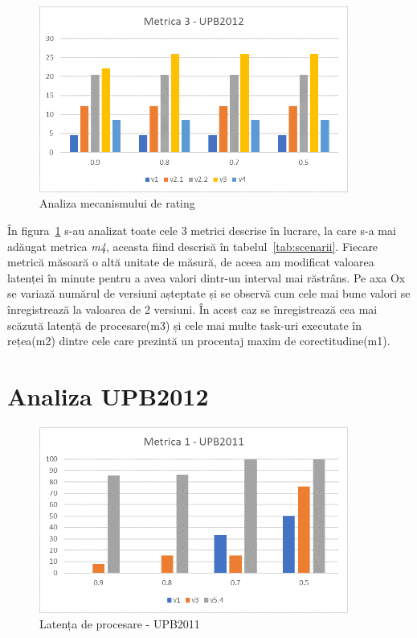 \documentclass[12pt,a4paper]{report}
\begin{document}
\begin{figure}[th]
\centering
\includegraphics[width=4in]{pics/graphics/grafic13.png}
  \caption[]{Analiza mecanismului de rating}
  \label{fig:versiuniRating}
\end{figure}
În figura~\ref{fig:versiuniRating} s-au analizat toate cele 3 metrici descrise în lucrare, la care s-a mai adăugat metrica \textit{m4}, aceasta fiind descrisă în tabelul~\ref{tab:scenarii}. Fiecare metrică măsoară o altă unitate de măsură, de aceea am modificat valoarea latenței în minute pentru a avea valori dintr-un interval mai răstrâns. Pe axa Ox se variază numărul de versiuni așteptate și se observă cum cele mai bune valori se înregistrează la valoarea de 2 versiuni. În acest caz se înregistrează cea mai scăzută latență de procesare(m3) și cele mai multe task-uri executate în rețea(m2) dintre cele care prezintă un procentaj maxim de corectitudine(m1). 

\section{Analiza UPB2012}

\iftrue
\begin{figure}[th]
\centering
\includegraphics[width=4in]{pics/graphics/grafic9.png}
  \caption[]{Latența de procesare - UPB2011}
  \label{grafic10}
\end{figure}
\fi
\end{document}
